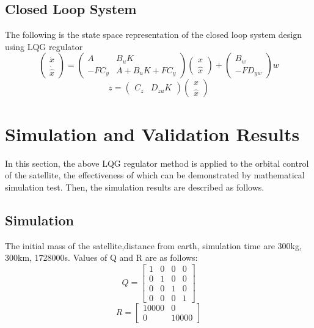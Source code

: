 \documentclass[journal,onecolumn]{IEEEtran}
\begin{document}
\subsection{Closed Loop System}
The following is the state space representation of the closed loop system design using LQG regulator
\begin{equation}
    \begin{pmatrix}
    \dot x\\
    \dot {\hat x}
    \end{pmatrix}
    =
    \begin{pmatrix}
    A&B_uK\\
    -FC_y&A+B_uK+FC_y
    \end{pmatrix}
     \begin{pmatrix}
    x\\
    {\hat x}
    \end{pmatrix}
    +
     \begin{pmatrix}
    B_w\\
    -FD_{yw}
    \end{pmatrix}
    w
\end{equation}
\begin{equation}
    z = 
       \begin{pmatrix}
    C_z&D_{zu}K
    \end{pmatrix}
    \begin{pmatrix}
    x\\
    {\hat x}
    \end{pmatrix}
\end{equation}




\section{Simulation and Validation Results}

In this section, the above LQG regulator method is applied to the orbital control of the satellite, the effectiveness of which can be demonstrated by mathematical simulation test. Then, the simulation results are described as follows.

\subsection{Simulation}
The initial mass of the satellite,distance from earth, simulation time are 300kg, 300km, 1728000s. Values of Q and R are as follows:
\begin{equation}
Q = 
    \begin{bmatrix}
    1&0&0&0\\
    0&1&0&0\\
    0&0&1&0\\
    0&0&0&1
    \end{bmatrix}
\end{equation}
\begin{equation}
R = 
    \begin{bmatrix}
    10000&0\\
    0&10000
    \end{bmatrix}
\end{equation}
\end{document}
